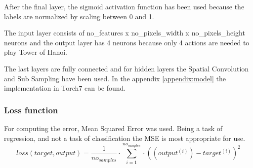 After the final layer, the sigmoid activation function has been used because the labels are normalized by scaling between 0 and 1.

The input layer consists of no_features x no_pixels_width x no_pixels_height neurons and the output layer has 4 neurons because only 4 actions are needed to play Tower of Hanoi.

The last layers are fully connected and for hidden layers the Spatial Convolution and Sub Sampling have been used. In the appendix \ref{appendix:model} the implementation in Torch7 can be found.

\subsubsection{Loss function}
For computing the error, Mean Squared Error was used. Being a task of regression, and not a task of classification the MSE is most appropriate for use.
\begin{equation}
loss(target,output) = \frac{1}{no_{samples}}\cdot\displaystyle\sum_{i=1}^{no_{samples}}\cdot((output^{(i)}) - target^{(i)})^2
\end{equation}
\newpage
